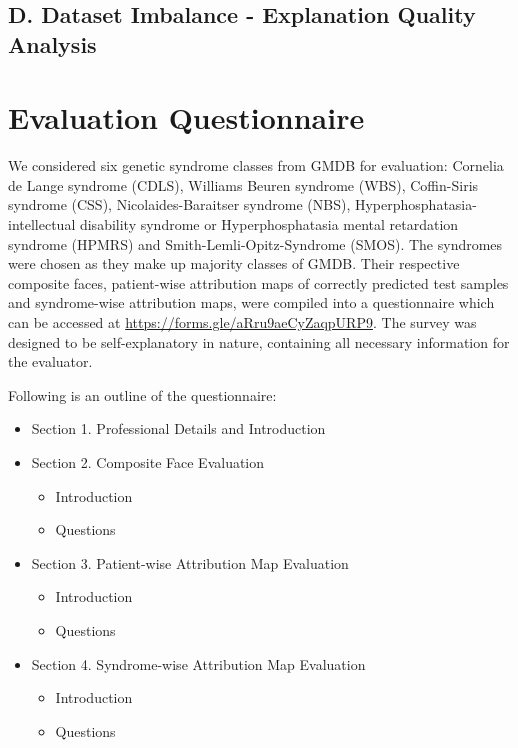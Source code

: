 \documentclass[../report.tex]{subfiles}
\begin{document}
    \subsection{D. Dataset Imbalance - Explanation Quality Analysis}
    
    
   \section{Evaluation Questionnaire}
   We considered six genetic syndrome classes from GMDB for evaluation: Cornelia de Lange syndrome (CDLS), Williams Beuren syndrome (WBS),  Coffin-Siris syndrome (CSS),  Nicolaides-Baraitser syndrome (NBS), Hyperphosphatasia-intellectual disability syndrome or Hyperphosphatasia mental retardation syndrome (HPMRS) and Smith-Lemli-Opitz-Syndrome (SMOS). The syndromes were chosen as they make up majority classes of GMDB. Their respective composite faces, patient-wise attribution maps of correctly predicted test samples and syndrome-wise attribution maps, were compiled into a questionnaire which can be accessed at \url{https://forms.gle/aRru9aeCyZaqpURP9}. The survey was designed to be self-explanatory in nature, containing all necessary information for the evaluator.
   
   Following is an outline of the questionnaire:
   \begin{itemize}
   	\item Section 1. Professional Details and Introduction
   	\item Section 2. Composite Face Evaluation
   		\begin{itemize}
   		\item Introduction
   		\item Questions
   		\end{itemize}
   \item Section 3. Patient-wise Attribution Map Evaluation
   		\begin{itemize}
   		\item Introduction
   		\item Questions	
   		\end{itemize}
   	\item Section 4. Syndrome-wise Attribution Map Evaluation
   	\begin{itemize}
   	\item Introduction
   	\item Questions
   \end{itemize}
   \end{itemize}
\end{document}
